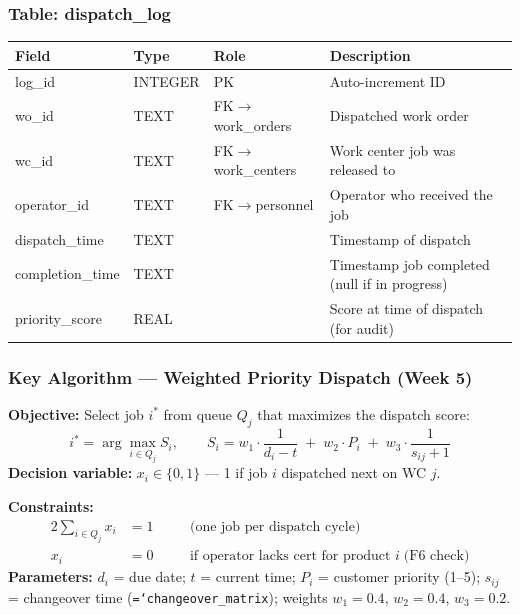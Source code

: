 \documentclass[11pt]{article}
\newcommand{\tfield}[1]{\texttt{\hyphenchar\font=`\-\relax #1}}
\begin{document}
\subsubsection*{Table: dispatch\_log}
\begin{table}[H]\centering\small
\begin{tabular}{@{} l l l L{5.5cm} @{}}
\toprule
\textbf{Field} & \textbf{Type} & \textbf{Role} & \textbf{Description} \\
\midrule
log\_id         & INTEGER & PK  & Auto-increment ID \\
wo\_id          & TEXT    & FK$\to$work\_orders & Dispatched work order \\
wc\_id          & TEXT    & FK$\to$work\_centers & Work center job was released to \\
operator\_id    & TEXT    & FK$\to$personnel & Operator who received the job \\
dispatch\_time  & TEXT    &     & Timestamp of dispatch \\
completion\_time & TEXT   &     & Timestamp job completed (null if in progress) \\
priority\_score & REAL    &     & Score at time of dispatch (for audit) \\
\bottomrule
\end{tabular}
\end{table}

\subsubsection*{Key Algorithm --- Weighted Priority Dispatch (Week 5)}

\begin{eqbox}
\textbf{Objective:} Select job $i^*$ from queue $Q_j$ that maximizes the dispatch score:
\[
i^* = \arg\max_{i \in Q_j} S_i, \qquad S_i = w_1 \cdot \frac{1}{d_i - t} \;+\; w_2 \cdot P_i \;+\; w_3 \cdot \frac{1}{s_{ij}+1}
\]
\textbf{Decision variable:} $x_i \in \{0,1\}$ --- 1 if job $i$ dispatched next on WC $j$.

\textbf{Constraints:}
\begin{alignat}{2}
\sum_{i \in Q_j} x_i &= 1 &\quad& \text{(one job per dispatch cycle)} \\
x_i &= 0 &\quad& \text{if operator lacks cert for product } i \;\text{(F6 check)}
\end{alignat}
\textbf{Parameters:} $d_i$ = due date; $t$ = current time; $P_i$ = customer priority (1--5); $s_{ij}$ = changeover time (\tfield{changeover\_matrix}); weights $w_1 = 0.4$, $w_2 = 0.4$, $w_3 = 0.2$.
\end{eqbox}
\end{document}
